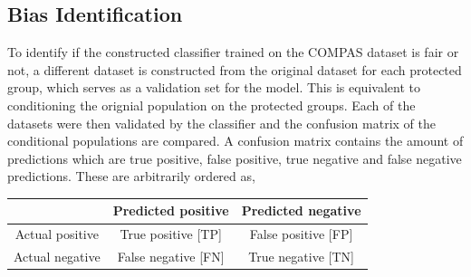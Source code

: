 \documentclass[11pt, fleqn, titlepage]{article}
\begin{document}
	
	\subsection{Bias Identification}\label{bias_id}
	To identify if the constructed classifier trained on the COMPAS dataset is fair or not, a different dataset is constructed from the original dataset for each protected group, which serves as a validation set for the model. This is equivalent to conditioning the orignial population on the protected groups. Each of the datasets were then validated by the classifier and the confusion matrix of the conditional populations are compared. A confusion matrix contains the amount of predictions which are true positive, false positive, true negative and false negative predictions. These are arbitrarily ordered as,	
	
	\begin{center}
		\bgroup
		\def\arraystretch{2}%
		\begin{tabular}{c | c c |}
			& Predicted positive & Predicted negative \\ 
			\hline 
			Actual positive & True positive [TP] & False positive [FP] \\
			Actual negative & False negative [FN] & True negative [TN] \\ 
			\hline
		\end{tabular}
		\egroup
	\end{center}
	
\end{document}
